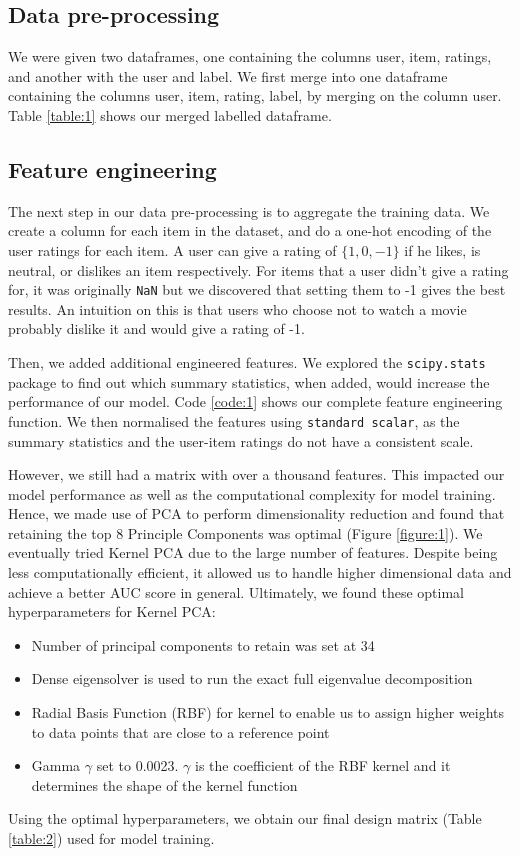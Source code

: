 \documentclass[12pt]{article}
\begin{document}
\subsection{Data pre-processing}
We were given two dataframes, one containing the columns user, item, ratings, and another with the user and label. We first merge into one dataframe containing the columns user, item, rating, label, by merging on the column user. Table \ref{table:1} shows our merged labelled dataframe.
\subsection{Feature engineering}
The next step in our data pre-processing is to aggregate the training data. We create a column for each item in the dataset, and do a one-hot encoding of the user ratings for each item. A user can give a rating of $\{1, 0, -1\}$ if he likes, is neutral, or dislikes an item respectively. For items that a user didn't give a rating for, it was originally \lstinline{NaN} but we discovered that setting them to -1 gives the best results. An intuition on this is that users who choose not to watch a movie probably dislike it and would give a rating of -1.

Then, we added additional engineered features. We explored the \lstinline{scipy.stats} package to find out which summary statistics, when added, would increase the performance of our model. Code \ref{code:1} shows our complete feature engineering function. We then normalised the features using \lstinline{standard scalar}, as the summary statistics and the user-item ratings do not have a consistent scale.

However, we still had a matrix with over a thousand features. This impacted our model performance as well as the computational complexity for model training. Hence, we made use of PCA to perform dimensionality reduction and found that retaining the top 8 Principle Components was optimal (Figure \ref{figure:1}). We eventually tried Kernel PCA due to the large number of features. Despite being less computationally efficient, it allowed us to handle higher dimensional data and achieve a better AUC score in general. Ultimately, we found these optimal hyperparameters for Kernel PCA:
\begin{itemize}
  \item Number of principal components to retain was set at 34
  \item Dense eigensolver is used to run the exact full eigenvalue decomposition
  \item Radial Basis Function (RBF) for kernel to enable us to assign higher weights to data points that are close to a reference point
  \item Gamma $\gamma$ set to 0.0023. $\gamma$ is the coefficient of the RBF kernel and it determines the shape of the kernel function
\end{itemize}
Using the optimal hyperparameters, we obtain our final design matrix (Table \ref{table:2}) used for model training.
\end{document}
